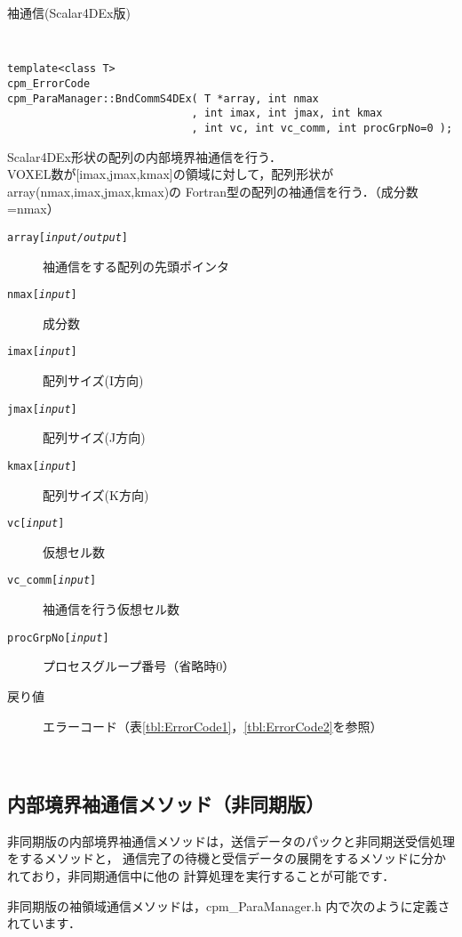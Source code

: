 \begin{spacing}{0.8}
\begin{itembox}[l]{袖通信(Scalar4DEx版)}
{\tt
\begin{verbatim}
template<class T>
cpm_ErrorCode
cpm_ParaManager::BndCommS4DEx( T *array, int nmax
                             , int imax, int jmax, int kmax
                             , int vc, int vc_comm, int procGrpNo=0 );
\end{verbatim}
}
Scalar4DEx形状の配列の内部境界袖通信を行う．\\
VOXEL数が[imax,jmax,kmax]の領域に対して，配列形状がarray(nmax,imax,jmax,kmax)の
Fortran型の配列の袖通信を行う．（成分数=nmax）
\begin{description}
\item[{\tt array[{\it input/output}]}] 袖通信をする配列の先頭ポインタ
\item[{\tt nmax[{\it input}]}] 成分数
\item[{\tt imax[{\it input}]}] 配列サイズ(I方向)
\item[{\tt jmax[{\it input}]}] 配列サイズ(J方向)
\item[{\tt kmax[{\it input}]}] 配列サイズ(K方向)
\item[{\tt vc[{\it input}]}] 仮想セル数
\item[{\tt vc\_comm[{\it input}]}] 袖通信を行う仮想セル数
\item[{\tt procGrpNo[{\it input}]}] プロセスグループ番号（省略時0）
\\
\item[戻り値] エラーコード（表\ref{tbl:ErrorCode1}，\ref{tbl:ErrorCode2}を参照）
\end{description}
\end{itembox}\\
\end{spacing}


\clearpage


\subsection{内部境界袖通信メソッド（非同期版）}
\label{Hbndcomm}
非同期版の内部境界袖通信メソッドは，送信データのパックと非同期送受信処理をするメソッドと，
通信完了の待機と受信データの展開をするメソッドに分かれており，非同期通信中に他の
計算処理を実行することが可能です．

非同期版の袖領域通信メソッドは，cpm\_ParaManager.h 内で次のように定義されています．\\

